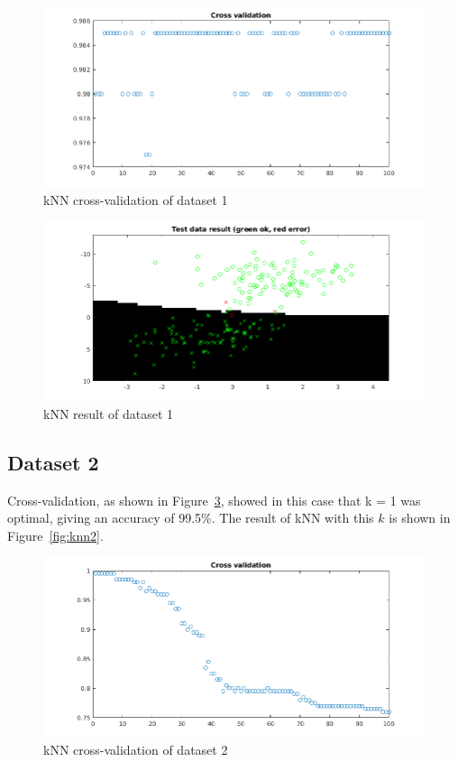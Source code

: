 \documentclass{article}
\begin{document}
\begin{figure}[h!]
    \includegraphics[width=13cm]{dataset1knncv.png}
    \caption{kNN cross-validation of dataset 1}
    \label{fig:cv1}
\end{figure}

\begin{figure}[h!]
    \includegraphics[width=13cm]{dataset1knnres.png}
    \caption{kNN result of dataset 1}
    \label{fig:knn1}
\end{figure}

\subsection{Dataset 2}

Cross-validation, as shown in Figure~\ref{fig:cv2}, showed in this
case that k = 1 was optimal, giving an accuracy of 99.5\%. 
The result of kNN with this $k$ is shown in Figure~\ref{fig:knn2}.

\begin{figure}[h!]
    \includegraphics[width=13cm]{dataset2knncv.png}
    \caption{kNN cross-validation of dataset 2}
    \label{fig:cv2}
\end{figure}
\end{document}
